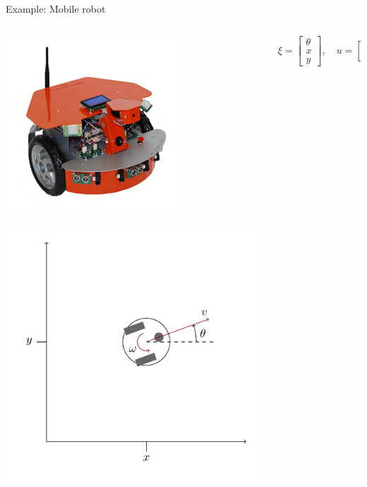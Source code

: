 \documentclass[presentation,aspectratio=169]{beamer}
\begin{document}
\begin{frame}[label={sec:orgafb5849}]{Example: Mobile robot}
\begin{columns}
\begin{column}{0.4\columnwidth}
\begin{center}
 \includegraphics[width=.3\linewidth]{../../figures/x80pro.jpg}
\end{center}
\begin{center}
 \includegraphics[width=1.0\linewidth]{../../figures/unicycle-model}
\end{center}
\end{column}

\begin{column}{0.6\columnwidth}
\pause

\[ \xi = \begin{bmatrix} \theta\\x\\y \end{bmatrix},   \quad u = \begin{bmatrix} \omega\\v \end{bmatrix}\]




\end{column}
\end{columns}
\end{frame}
\end{document}
